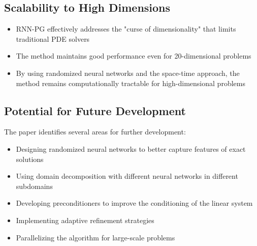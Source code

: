 \documentclass[11pt,a4paper]{article}
\begin{document}
\subsection{Scalability to High Dimensions}

\begin{itemize}
    \item RNN-PG effectively addresses the "curse of dimensionality" that limits traditional PDE solvers
    \item The method maintains good performance even for 20-dimensional problems
    \item By using randomized neural networks and the space-time approach, the method remains computationally tractable for high-dimensional problems
\end{itemize}

\subsection{Potential for Future Development}

The paper identifies several areas for further development:
\begin{itemize}
    \item Designing randomized neural networks to better capture features of exact solutions
    \item Using domain decomposition with different neural networks in different subdomains
    \item Developing preconditioners to improve the conditioning of the linear system
    \item Implementing adaptive refinement strategies
    \item Parallelizing the algorithm for large-scale problems
\end{itemize}
\end{document}
